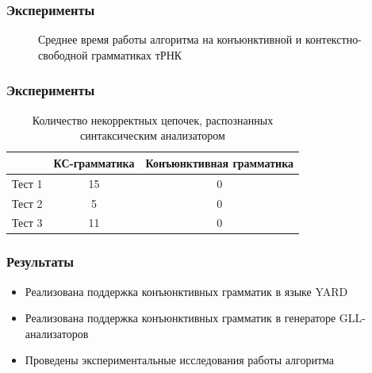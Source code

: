 \documentclass{beamer}
\begin{document}
\begin{frame}
  \transwipe[direction=90]
  \frametitle{Эксперименты}
  \begin{figure}
    \begin{center}
    \vspace{-13pt}
    \caption{Среднее время работы алгоритма на конъюнктивной и контекстно-свободной грамматиках тРНК}
    \label{time}
    \end{center}
    \end{figure}
\end{frame} 

\begin{frame}
  \transwipe[direction=90]
  \frametitle{Эксперименты}
  \begin{table}
  \begin{center}
  \begin{tabular}{ | c | c | c |}
    \hline
     & КС-грамматика & Конъюнктивная грамматика \\ \hline
    Тест 1 & 15 & 0 \\\hline
    Тест 2 & 5 & 0 \\\hline
    Тест 3 & 11 & 0 \\
    \hline
  \end{tabular}
  \caption{Количество некорректных цепочек, распознанных синтаксическим анализатором}
  \label{mistakes}
  \end{center}
  \end{table}
\end{frame} 

\begin{frame}
  \transwipe[direction=90]
  \frametitle{Результаты}
  \begin{itemize}
    \item Реализована поддержка конъюнктивных грамматик в языке YARD
    \item Реализована поддержка конъюнктивных грамматик в генераторе GLL-анализаторов
    \item Проведены экспериментальные исследования работы алгоритма
  \end{itemize}
\end{frame}
\end{document}
